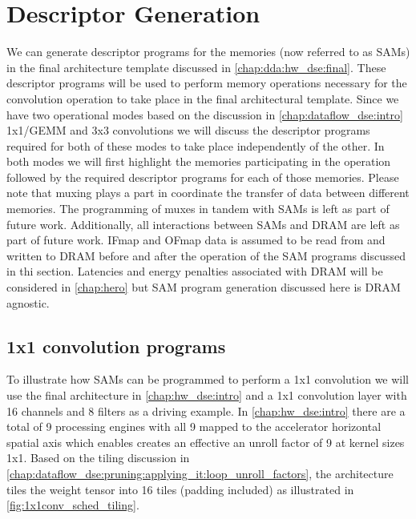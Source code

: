 \clearpage


\section{Descriptor Generation}
\label{chap:sams:acc_scheduling}

We can generate descriptor programs for the memories (now referred to as SAMs)
in the final architecture template discussed in \autoref{chap:dda:hw_dse:final}.
These descriptor programs will be used to perform memory operations necessary
for the convolution operation to take place in the final architectural template.
Since we have two operational modes based on the discussion in
\autoref{chap:dataflow_dse:intro} 1x1/GEMM and 3x3 convolutions we will discuss the
descriptor programs required for both of these modes to take place independently of
the other. In both modes we will first highlight the memories participating in
the operation followed by the required descriptor programs for each of those
memories. Please note that muxing plays a part in coordinate the transfer of
data between different memories. The programming of muxes in tandem with SAMs is
left as part of future work. Additionally, all interactions between SAMs and
DRAM are left as part of future work. IFmap and OFmap data is assumed to be read
from and written to DRAM before and after the operation of the SAM programs
discussed in thi section. Latencies and energy penalties associated with DRAM
will be considered in \autoref{chap:hero} but SAM program generation discussed
here is DRAM agnostic.

\subsection{1x1 convolution programs}
\label{chap:sams:acc_scheduling:1x1}

To illustrate how SAMs can be programmed to perform a 1x1 convolution we will
use the final architecture in \autoref{chap:hw_dse:intro} and a 1x1 convolution
layer with 16 channels and 8 filters as a driving example. In
\autoref{chap:hw_dse:intro} there are a total of 9 processing engines with all 9
mapped to the accelerator horizontal spatial axis which enables creates an
effective an unroll factor of 9 at kernel sizes 1x1. Based on the tiling
discussion in
\autoref{chap:dataflow_dse:pruning:applying_it:loop_unroll_factors}, the
architecture tiles the weight tensor into 16 tiles (padding included) as
illustrated in \autoref{fig:1x1conv_sched_tiling}.


